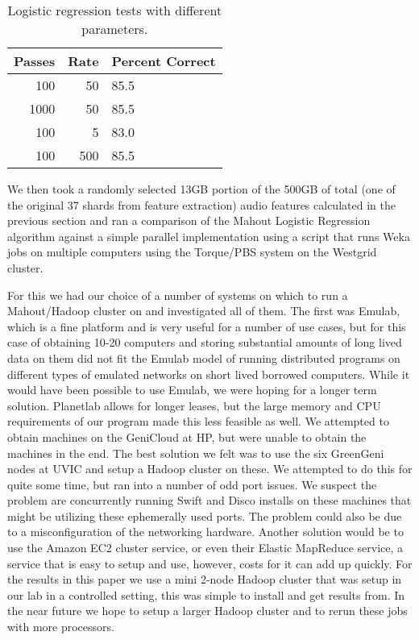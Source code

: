 \begin{table}
\begin{tabular}{|r|r|l|}
\hline
 Passes  & Rate  & Percent Correct                                         \\
\hline
    100  &    50  &  85.5  \\
   1000  &    50  &  85.5  \\
    100  &     5  &  83.0  \\
    100  &   500  &  85.5  \\
\hline
\end{tabular}
\caption{Logistic regression tests with different parameters.}
\label{table:logisticRegressionTests}
\end{table}

We then took a randomly selected 13GB portion of the 500GB of total
(one of the original 37 shards from feature extraction) audio features
calculated in the previous section and ran a comparison of the Mahout
Logistic Regression algorithm against a simple parallel
implementation using a script that runs Weka jobs on multiple
computers using the Torque/PBS system on the Westgrid cluster.

For this we had our choice of a number of systems on which to run a
Mahout/Hadoop cluster on and investigated all of them.  The first was
Emulab, which is a fine platform and is very useful for a number of
use cases, but for this case of obtaining 10-20 computers and storing
substantial amounts of long lived data on them did not fit the Emulab
model of running distributed programs on different types of emulated
networks on short lived borrowed computers.  While it would have been
possible to use Emulab, we were hoping for a longer term solution.
Planetlab allows for longer leases, but the large memory and CPU
requirements of our program made this less feasible as well.  We
attempted to obtain machines on the GeniCloud at HP, but were unable
to obtain the machines in the end.  The best solution we felt was to
use the six GreenGeni nodes at UVIC and setup a Hadoop cluster on
these.  We attempted to do this for quite some time, but ran into a
number of odd port issues.  We suspect the problem are concurrently
running Swift and Disco installs on these machines that might be
utilizing these ephemerally used ports.  The problem could also be due
to a misconfiguration of the networking hardware.  Another solution
would be to use the Amazon EC2 cluster service, or even their Elastic
MapReduce service, a service that is easy to setup and use, however,
costs for it can add up quickly.  For the results in this paper we use
a mini 2-node Hadoop cluster that was setup in our lab in a controlled
setting, this was simple to install and get results from.  In the near
future we hope to setup a larger Hadoop cluster and to rerun these
jobs with more processors.

